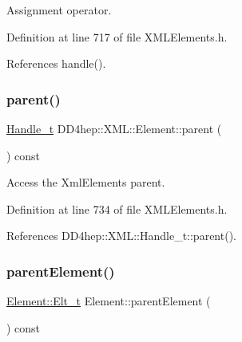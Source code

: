 Assignment operator. 



Definition at line 717 of file X\+M\+L\+Elements.\+h.



References handle().

\hypertarget{class_d_d4hep_1_1_x_m_l_1_1_element_ae4de44fe9105de7b9eedf4c7f6e41c89}{}\label{class_d_d4hep_1_1_x_m_l_1_1_element_ae4de44fe9105de7b9eedf4c7f6e41c89} 
\subsubsection{\texorpdfstring{parent()}{parent()}}
{\footnotesize\ttfamily \hyperlink{class_d_d4hep_1_1_x_m_l_1_1_handle__t}{Handle\+\_\+t} D\+D4hep\+::\+X\+M\+L\+::\+Element\+::parent (\begin{DoxyParamCaption}{ }\end{DoxyParamCaption}) const\hspace{0.3cm}{\ttfamily [inline]}}



Access the Xml\+Elements parent. 



Definition at line 734 of file X\+M\+L\+Elements.\+h.



References D\+D4hep\+::\+X\+M\+L\+::\+Handle\+\_\+t\+::parent().

\hypertarget{class_d_d4hep_1_1_x_m_l_1_1_element_af28f2ccbfc60353c8a1bff393c13e64a}{}\label{class_d_d4hep_1_1_x_m_l_1_1_element_af28f2ccbfc60353c8a1bff393c13e64a} 
\subsubsection{\texorpdfstring{parent\+Element()}{parentElement()}}
{\footnotesize\ttfamily \hyperlink{class_d_d4hep_1_1_x_m_l_1_1_element_af63782f6873c3d8c9b28e1777cde9275}{Element\+::\+Elt\+\_\+t} Element\+::parent\+Element (\begin{DoxyParamCaption}{ }\end{DoxyParamCaption}) const}




